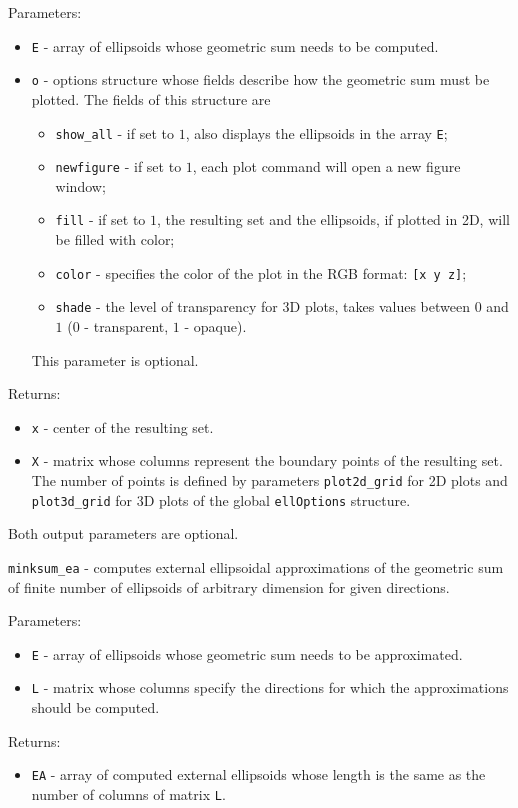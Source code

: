 Parameters:
\begin{itemize}
\item {\tt E} - array of ellipsoids whose geometric sum needs to be computed.
\item {\tt o} - options structure whose fields describe how the geometric
sum must be plotted. The fields of this structure are
\begin{itemize}
\item {\tt show\_all} - if set to $1$, also displays the ellipsoids in the
array {\tt E};
\item {\tt newfigure} - if set to $1$, each plot command will open a new
figure window;
\item {\tt fill} - if set to $1$, the resulting set and the ellipsoids,
if plotted in 2D, will be filled with color;
\item {\tt color} - specifies the color of the plot in the RGB format:
{\tt [x y z]};
\item {\tt shade} - the level of transparency for 3D plots, takes values
between $0$ and $1$ ($0$ - transparent, $1$ - opaque).
\end{itemize}
This parameter is optional.
\end{itemize}

Returns:
\begin{itemize}
\item {\tt x} - center of the resulting set.
\item {\tt X} - matrix whose columns represent the boundary points of the
resulting set. The number of points is defined by parameters
{\tt plot2d\_grid} for 2D plots and {\tt plot3d\_grid} for 3D plots of the
global {\tt ellOptions} structure.
\end{itemize}
Both output parameters are optional.

\newpage

{\Large {\tt minksum\_ea}} - computes external ellipsoidal approximations
of the geometric sum of finite number of ellipsoids of arbitrary dimension
for given directions.

Parameters:
\begin{itemize}
\item {\tt E} - array of ellipsoids whose geometric sum needs to be
approximated.
\item {\tt L} - matrix whose columns specify the directions for which
the approximations should be computed.
\end{itemize}

Returns:
\begin{itemize}
\item {\tt EA} - array of computed external ellipsoids whose length is the same
as the number of columns of matrix {\tt L}.
\end{itemize}

